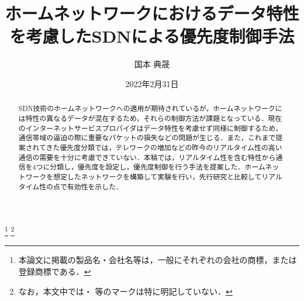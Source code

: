 \documentclass[a4paper,11pt,uplatex]{ujreport}
\title{ホームネットワークにおけるデータ特性を考慮したSDNによる優先度制御手法}  %
\author{国本 典晟}  %
\date{2022年2月31日}  %
\begin{document}
\maketitle
\clearpage

\begin{abstract}

  SDN技術のホームネットワークへの適用が期待されているが，ホームネットワークには特性の異なるデータが混在するため，それらの制御方法が課題となっている．現在のインターネットサービスプロバイダはデータ特性を考慮せず同様に制御するため，通信帯域の逼迫の際に重要なパケットの損失などの問題が生じる．また，これまで提案されてきた優先度分類では，テレワークの増加などの昨今のリアルタイム性の高い通信の需要を十分に考慮できていない．本稿では，リアルタイム性を含む特性から通信を4つに分類し，優先度を設定し，優先度制御を行う手法を提案した．ホームネットワークを想定したネットワークを構築して実験を行い，先行研究と比較してリアルタイム性の点で有効性を示した．

\end{abstract}


\footnote[0]{本論文に掲載の製品名・会社名等は，一般にそれぞれの会社の商標，または登録商標である．}
\footnote[0]{なお，本文中では\texttrademark ・ \textregistered 等のマークは特に明記していない．}


\setcounter{page}{0}
\end{document}
